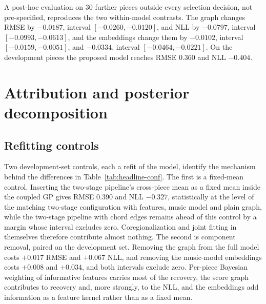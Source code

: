 \documentclass[11pt,a4paper]{report}
\newcommand{\rmseGPdev}{0.360}
\newcommand{\nllGPdev}{$-0.404$}
\begin{document}
A post-hoc evaluation on 30 further pieces outside every selection
decision, not pre-specified, reproduces the two within-model contrasts. The
graph changes RMSE by $-0.0187$, interval $[-0.0260, -0.0120]$, and NLL by
$-0.0797$, interval $[-0.0993, -0.0613]$, and the embeddings change them by
$-0.0102$, interval $[-0.0159, -0.0051]$, and $-0.0334$, interval
$[-0.0464, -0.0221]$. On the development pieces the proposed model reaches
RMSE \rmseGPdev{} and NLL \nllGPdev{}.


\section{Attribution and posterior decomposition}\label{sec:attribution}

\subsection{Refitting controls}
Two development-set controls, each a refit of the model, identify the
mechanism behind the differences in Table~\ref{tab:headline-conf}. The first
is a fixed-mean control. Inserting the two-stage pipeline's cross-piece mean
as a fixed mean inside the coupled GP gives RMSE 0.390 and NLL $-0.327$, statistically
at the level of the matching two-stage configuration with features, music
model and plain graph, while the two-stage pipeline with chord edges remains
ahead of this control by a margin whose interval excludes zero.
Coregionalization and joint fitting in themselves therefore contribute almost
nothing. The second is component removal, paired on the development set.
Removing the graph from the full model costs $+0.017$ RMSE and $+0.067$ NLL,
and removing the music-model embeddings costs $+0.008$ and $+0.034$, and both
intervals exclude zero. Per-piece Bayesian weighting of informative
features carries most of the recovery, the score graph contributes to
recovery and, more strongly, to the NLL, and the embeddings add
information as a feature kernel rather than as a fixed mean.
\end{document}
